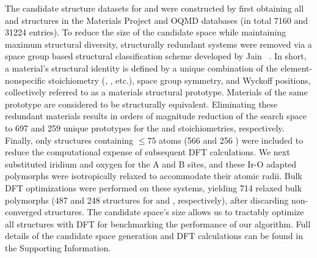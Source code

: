 %
%
%
The candidate structure datasets for \IrOtwo and \IrOthree were constructed by first obtaining all \ABtwo and \ABthree structures in the Materials Project\cite{Jain2013} and OQMD\cite{Kirklin2015} databases
(in total \num{7160} \ABtwo and \num{31224} \ABthree entries).
%
To reduce the size of the candidate space while maintaining maximum structural diversity, structurally redundant systems were removed via a space group based structural classification scheme developed by Jain ~\cite{Jain2018}.
%
In short, a material's structural identity is defined by a unique combination of the element-nonspecific stoichiometry (\ABtwo, \ABthree, etc.), space group symmetry, and Wyckoff positions, collectively referred to as a materials structural prototype.
%
Materials of the same prototype are considered to be structurally equivalent.
%
%
Eliminating these redundant materials results in orders of magnitude reduction of the search space to \num{697} and \num{259} unique prototypes for the \ABtwo and \ABthree stoichiometries, respectively.
%
%
Finally, only structures containing $\leq\num{75}$ atoms
(\num{566} \ABtwo and \num{256} \ABthree)
were included to reduce the computational expense of subsequent DFT calculations.
%
We next substituted iridium and oxygen for the A and B sites, and these Ir-O adapted polymorphs were isotropically relaxed to accommodate their atomic radii.
%
Bulk DFT optimizations were performed on these systems,
yielding \num{714} relaxed bulk \IrOx polymorphs
(\num{487} and \num{248} structures for \IrOtwo and \IrOthree, respectively),
after discarding  non-converged structures.
%
The candidate space's size allows us to tractably optimize all structures with DFT for benchmarking the performance of our algorithm.
%
Full details of the candidate space generation and DFT calculations can be found in the Supporting Information.


